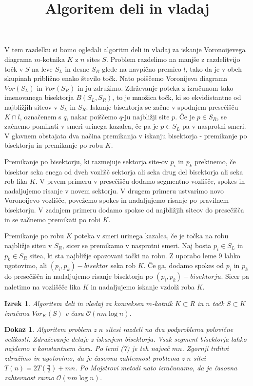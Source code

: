 \documentclass{article}
\title{Algoritem deli in vladaj}
\newtheorem{izrek}{Izrek}
\newtheorem{dokaz}{Dokaz}
\begin{document}
V tem razdelku si bomo ogledali algoritm deli in vladaj za iskanje Voronoijevega diagrama $m$-kotnika $K$ z $n$ sites $S$.
Problem razdelimo na manjše z razdelitvijo točk v $S$ na leve $S_L$ in desne $S_R$ glede na navpično premico $l$, tako da je v obeh skupinah približno enako število točk.
Nato poiščemo Voronijeva diagrama $Vor (S_L)$ in $Vor (S_R)$ in ju združimo.
Zdrževanje poteka z izračunom tako imenovanega bisektorja $B (S_L, S_R)$, to je množica točk, ki so ekvidistantne od najbližjih siteov v $S_L$ in $S_R$.
Iskanje bisektorja se začne v spodnjem presečišču $K \cap l$, označenem s $q$, nakar poiščemo $q$-ju najbližji site $p$. 
Če je $p \in S_R$, se začnemo pomikati v smeri urinega kazalca, če pa je $p \in S_L$ pa v nasprotni smeri.
V glavnem obstajata dva načina premikanja v iskanju bisektorja - premikanje po bisektorju in premikanje po robu $K$.

Premikanje po bisektorju, ki razmejuje sektorja site-ov $p_i$ in $p_k$ prekinemo, če bisektor seka enega od dveh vozlišč sektorja ali seka drug del bisektorja ali seka rob lika $K$.
V prvem primeru v presečišču dodamo segmentno vozlišče, spokes in nadaljujemo risanje v novem sektorju.
V drugem primeru ustvarimo novo Voronoijevo vozlišče, povežemo spokes in nadaljujemo risanje po pravilnem bisektorju.
V zadnjem primeru dodamo spokse od najbližjih siteov do presečišča in se začnemo premikati po robi $K$.

Premikanje po robu $K$ poteka v smeri urinega kazalca, če je točka na robu najbližje siteu v $S_R$, sicer se premikamo v nasprotni smeri.
Naj bosta $p_i \in S_L$ in $p_k \in S_R$ sitea, ki sta najbližje opazovani točki na robu. 
Z uporabo leme 9 lahko ugotovimo, ali $(p_i, p_k)-bisektor$ seka rob $K$. 
Če ga, dodamo spokes od $p_i$ in $p_k$ do presečišča in nadaljujemo risanje bisektorja po $(p_i, p_k)-bisektorju$.
Sicer pa naletimo na vozliščče lika $K$ in nadaljujemo iskanje vzdolž roba $K$.

\begin{izrek}
    Algoritem deli in vladaj za konveksen $m$-kotnik $K \subset R$ in $n$ točk $S \subset K$ izračuna $Vor_K (S)$ v času $\mathcal{O} (nm \log n)$.
\end{izrek}

\begin{dokaz}
    Algoritem problem z $n$ sitesi razdeli na dva podproblema polovične velikosti. 
    Združevanje deluje z iskanjem bisektorja. 
    Vsak segment bisektorja lahko najdemo v konstantnem času. Po lemi (7) je teh največ $mn$.
    Zgornji trditvi združimo in ugotovimo, da je časovna zahtevnost problema z $n$ sitei $T(n) = 2 T(\frac{n}{2}) + mn$.
    Po Mojstrovi metodi nato izračunamo, da je časovna zahtevnost ravno $\mathcal{O} (nm \log n)$.
\end{dokaz}
\end{document}
